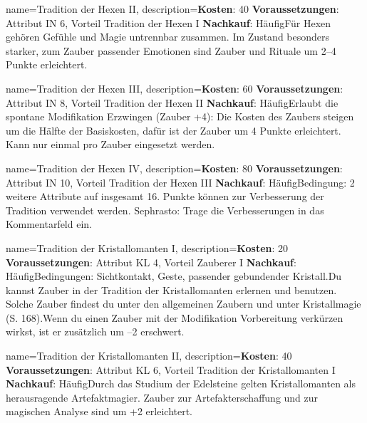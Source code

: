 {
    name={Tradition der Hexen II},
    description={\textbf{Kosten}: 40 \textbf{Voraussetzungen}: Attribut IN 6, Vorteil Tradition der Hexen I \textbf{Nachkauf}: Häufig\newline Für Hexen gehören Gefühle und Magie untrennbar zusammen. Im Zustand besonders starker, zum Zauber passender Emotionen sind Zauber und Rituale um 2–4 Punkte erleichtert.}
}


{
    name={Tradition der Hexen III},
    description={\textbf{Kosten}: 60 \textbf{Voraussetzungen}: Attribut IN 8, Vorteil Tradition der Hexen II \textbf{Nachkauf}: Häufig\newline Erlaubt die spontane Modifikation Erzwingen (Zauber +4): Die Kosten des Zaubers steigen um die Hälfte der Basiskosten, dafür ist der Zauber um 4 Punkte erleichtert. Kann nur einmal pro Zauber eingesetzt werden.}
}


{
    name={Tradition der Hexen IV},
    description={\textbf{Kosten}: 80 \textbf{Voraussetzungen}: Attribut IN 10, Vorteil Tradition der Hexen III \textbf{Nachkauf}: Häufig\newline Bedingung: 2 weitere Attribute auf insgesamt 16. Punkte können zur Verbesserung der Tradition verwendet werden. Sephrasto: Trage die Verbesserungen in das Kommentarfeld ein.}
}


{
    name={Tradition der Kristallomanten I},
    description={\textbf{Kosten}: 20 \textbf{Voraussetzungen}: Attribut KL 4, Vorteil Zauberer I \textbf{Nachkauf}: Häufig\newline Bedingungen: Sichtkontakt, Geste, passender gebundender Kristall.\newline Du kannst Zauber in der Tradition der Kristallomanten erlernen und benutzen. Solche Zauber findest du unter den allgemeinen Zaubern und unter Kristallmagie (S. 168).\newline Wenn du einen Zauber mit der Modifikation Vorbereitung verkürzen wirkst, ist er zusätzlich um –2 erschwert.}
}


{
    name={Tradition der Kristallomanten II},
    description={\textbf{Kosten}: 40 \textbf{Voraussetzungen}: Attribut KL 6, Vorteil Tradition der Kristallomanten I \textbf{Nachkauf}: Häufig\newline Durch das Studium der Edelsteine gelten Kristallomanten als herausragende Artefaktmagier. Zauber zur Artefakterschaffung und zur magischen Analyse sind um +2 erleichtert.}
}


